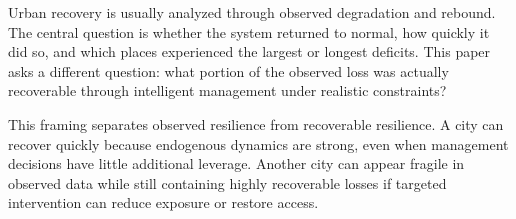 Urban recovery is usually analyzed through observed degradation and rebound. The central question is whether the system returned to normal, how quickly it did so, and which places experienced the largest or longest deficits. This paper asks a different question: what portion of the observed loss was actually recoverable through intelligent management under realistic constraints?

This framing separates observed resilience from recoverable resilience. A city can recover quickly because endogenous dynamics are strong, even when management decisions have little additional leverage. Another city can appear fragile in observed data while still containing highly recoverable losses if targeted intervention can reduce exposure or restore access.
